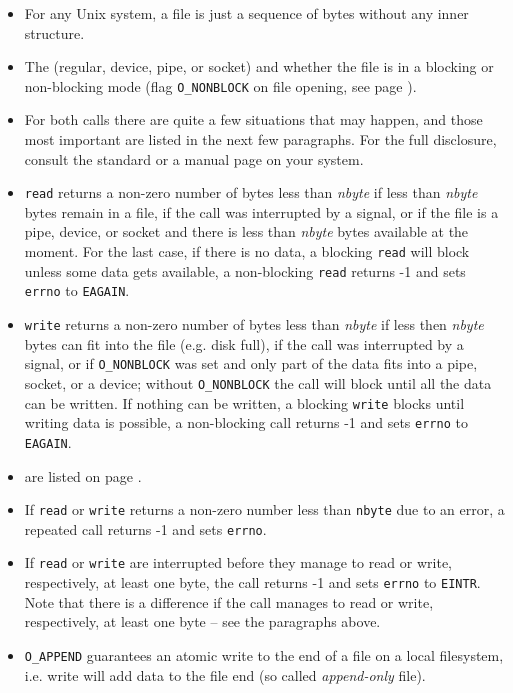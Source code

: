 \begin{itemize}
\setlength{\itemsep}{0.8\itemsep}
\item For any Unix system, a file is just a sequence of bytes without any inner
structure.
\item The  (regular, device, pipe, or socket) and whether the file is in a
blocking or non-blocking mode (flag \texttt{O\_NONBLOCK} on file opening, see
page \pageref{O_NONBLOCK}).
\item For both calls there are quite a few situations that may happen, and 
those most important are listed in the next few paragraphs.  For the full
disclosure, consult the standard or a manual page on your system.
\item \texttt{read} returns a non-zero number of bytes less than \emph{nbyte} if
less than \emph{nbyte} bytes remain in a file, if the call was interrupted
by a signal, or if the file is a pipe, device, or socket and there is less than
\emph{nbyte} bytes available at the moment.  For the last case, if there is no
data, a blocking \texttt{read} will block unless some data gets available, a
non-blocking \texttt{read} returns -1 and sets \texttt{errno} to
\texttt{EAGAIN}.
\item \texttt{write} returns a non-zero number of bytes less than \emph{nbyte}
if less then \emph{nbyte} bytes can fit into the file (e.g. disk full), if the call
was interrupted by a signal, or if \verb#O_NONBLOCK# was set and only part of
the data fits into a pipe, socket, or a device; without \verb#O_NONBLOCK#
the call will block until all the data can be written.  If nothing can be
written, a blocking \texttt{write} blocks until writing data is possible, a
non-blocking call returns -1 and sets \texttt{errno} to \texttt{EAGAIN}.
\item {} are listed on page
\pageref{NAMEDPIPE}.
\item
If \texttt{read} or \texttt{write} returns a non-zero number less than
\texttt{nbyte} due to an error, a repeated call returns -1 and sets
\texttt{errno}.
\item If \texttt{read} or \texttt{write} are interrupted before they manage to
read or write, respectively, at least one byte, the call returns -1 and sets
\texttt{errno} to \texttt{EINTR}.  Note that there is a difference if the call
manages to read or write, respectively, at least one byte -- see the paragraphs
above.
\item \texttt{O\_APPEND} guarantees an atomic write to the end of a file on a
local filesystem, i.e.  write will add data to the file end (so
called \emph{append-only} file).
\end{itemize}

